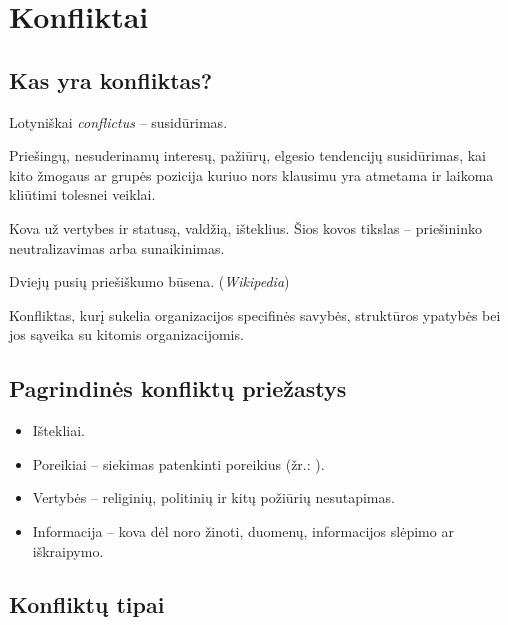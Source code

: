\chapter{Konfliktai}

\section{Kas yra konfliktas?}

Lotyniškai \emph{conflictus} – susidūrimas.

\begin{defn}[Konfliktas]
  Priešingų, nesuderinamų interesų, pažiūrų, elgesio tendencijų
  susidūrimas, kai kito žmogaus ar grupės pozicija kuriuo nors
  klausimu yra atmetama ir laikoma kliūtimi tolesnei veiklai.
\end{defn}


\begin{defn}[Konfliktas]
  Kova už vertybes ir statusą, valdžią, išteklius. Šios kovos tikslas
  – priešininko neutralizavimas arba sunaikinimas.
\end{defn}

\begin{defn}[Konfliktas]
  Dviejų pusių priešiškumo būsena. (\emph{Wikipedia})
\end{defn}

\begin{defn}
  Konfliktas, kurį sukelia organizacijos specifinės savybės,
  struktūros ypatybės bei jos sąveika su kitomis organizacijomis.
\end{defn}

\section{Pagrindinės konfliktų priežastys}

\begin{itemize}
  \item Ištekliai.
  \item Poreikiai – siekimas patenkinti poreikius
    (žr.: ).
  \item Vertybės – religinių, politinių ir kitų požiūrių nesutapimas.
  \item Informacija – kova dėl noro žinoti, duomenų, informacijos
    slėpimo ar iškraipymo.
\end{itemize}

\section{Konfliktų tipai}


